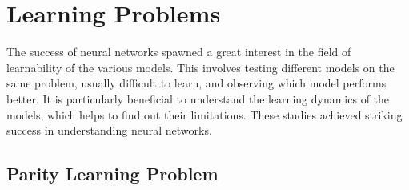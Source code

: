 \documentclass[a4paper, nobind]{templates/ociamthesis}
\begin{document}
\hypertarget{chap:chapter_2}{%
\chapter{Learning Problems}\label{chap:chapter_2}}

\minitoc 

\noindent The success of neural networks spawned a great interest in the field of learnability of the various models. This involves testing different models on the same problem, usually difficult to learn, and observing which model performs better. It is particularly beneficial to understand the learning dynamics of the models, which helps to find out their limitations. These studies achieved striking success in understanding neural networks.

\hypertarget{parity-learning-problem}{%
\section{Parity Learning Problem}\label{parity-learning-problem}}
\end{document}
